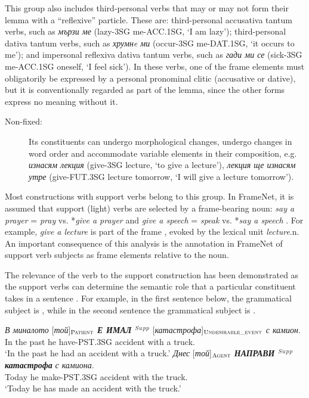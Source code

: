 \documentclass[output=paper,colorlinks,citecolor=brown]{langscibook}
\begin{document}
This group also includes third-personal verbs that may or may not form their lemma with a ``reflexive'' particle. These are:  third-personal accusativa tantum verbs, such as \emph{мързи ме} (lazy-3SG me-ACC.1SG, `I am lazy'); third-personal dativa tantum verbs, such as \emph{хрумнe ми} (occur-3SG me-DAT.1SG, `it occurs to me'); and impersonal reflexiva dativa tantum verbs, such as \emph{гади ми се} (sick-3SG me-ACC.1SG oneself, `I feel sick'). In these verbs, one of the frame elements must obligatorily be expressed by a personal pronominal clitic (accusative or dative), but it is conventionally regarded as part of the lemma, since the other forms express no meaning without it.
\begin{description}
\item[Non-fixed:] Its constituents can undergo morphological changes, undergo changes in word order and accommodate variable elements in their composition, e.g. \textit{изнасям лекция} (give-3SG lecture, `to give a lecture'), \textit{лекция ще изнасям утре} (give-FUT.3SG lecture tomorrow, `I will give a lecture tomorrow').
\end{description}

Most constructions with support verbs belong to this group. In FrameNet, it is assumed that support (light) verbs are selected by a frame-bearing noun: \textit{say a prayer} = \textit{pray} vs. *\textit{give a prayer} and \textit{give a speech} = \textit{speak} vs. *\textit{say a speech} \citep[244]{Fillmore2003}. For example, \emph{give a lecture} is part of the frame , evoked by the lexical unit \emph{lecture}.n. An important consequence of this analysis is the annotation in FrameNet of support verb subjects as frame elements relative to the noun.

The relevance of the verb to the support construction has been demonstrated as the support verbs can determine the semantic role that a particular constituent takes in a sentence \citep[244]{Fillmore2003}. For example, in the first sentence below, the grammatical subject is , while in the second sentence the grammatical subject is .

\begin{exe}
 \ex  \label{ch01:ex:21}
 \gll \textit{В миналото}  [\textit{той}]$_{\text{\textsc{Patient}}}$  \textit{\textbf{Е ИМАЛ $^S$$^u$$^p$$^p$}} [\textit{катастрофа}]$_{\text{\textsc{Undesirable\_event}}}$   \textit{с камион}.\\
 {In the past} {he}  {have-PST.3SG} {accident}  {with a truck}. \\
\glt `{In the past he had an accident with a truck.}'
\ex  \label{ch01:ex:22}
 \gll \textit{Днес}  [\textit{той}]$_{\text{\textsc{Agent}}}$  \textit{\textbf{НАПРАВИ $^S$$^u$$^p$$^p$}}  \textit{\textbf{катастрофа}}  \textit{с камиона}.\\
{Today} {he} {make-PST.3SG} {accident} {with the truck}. \\
\glt `{Today he has made an accident with the truck.}'
\end{exe}
\end{document}
